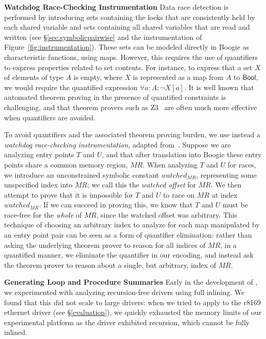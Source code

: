 \noindent\textbf{Watchdog Race-Checking Instrumentation }
%
Data race detection is performed by introducing sets containing the locks that are consistently held by each shared variable and sets containing all shared variables that are read and written (see \S\ref{sec:symbolicpairwise} and the instrumentation of Figure~\ref{fig:instrumentation}). These sets can be modeled directly in Boogie as characteristic functions, using maps. However, this requires the use of quantifiers to express properties related to set contents.  For instance, to express that a set $X$ of elements of type $A$ is empty, where $X$ is represented as a map from $A$ to $\mathsf{Bool}$, we would require the quantified expression $\forall a : A : \neg X[a]$.  It is well known that automated theorem proving in the presence of quantified constraints is challenging, and that theorem provers such as Z3~\cite{de2008z3} are often much more effective when quantifiers are avoided.  

To avoid quantifiers and the associated theorem proving burden, we use instead a \emph{watchdog race-checking instrumentation}, adapted from~\cite{bardsley2014engineering}.  Suppose we are analyzing entry points $T$ and $U$, and that after translation into Boogie these entry points share a common memory region, $\mathit{MR}$.  When analyzing $T$ and $U$ for races, we introduce an unconstrained symbolic constant $\mathit{watched}_{\mathit{MR}}$, representing some unspecified index into $\mathit{MR}$; we call this the \emph{watched offset} for $\mathit{MR}$.  We then attempt to prove that it is impossible for $T$ and $U$ to race on $\mathit{MR}$ at index $\mathit{watched}_{\mathit{MR}}$.  If we can succeed in proving this, we know that $T$ and $U$ must be race-free for the \emph{whole} of $\mathit{MR}$, since the watched offset was arbitrary.  This technique of choosing an arbitrary index to analyze for each map manipulated by an entry point pair can be seen as a form of quantifier elimination: rather than asking the underlying theorem prover to reason for all indices of $\mathit{MR}$, in a quantified manner, we eliminate the quantifier in our encoding, and instead ask the theorem prover to reason about a single, but arbitrary, index of $\mathit{MR}$.

\noindent\textbf{Generating Loop and Procedure Summaries }
%
Early in the development of \whoop, we experimented with analyzing recursion-free drivers using full inlining.  We found that this did not scale to large drivers: when we tried to apply \whoop to the r8169 ethernet driver (see \S\ref{evaluation}), we quickly exhausted the memory limits of our experimental platform as the driver exhibited recursion, which cannot be fully inlined.

